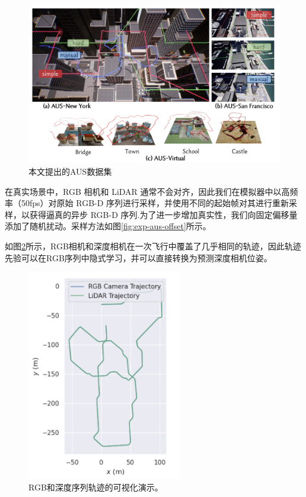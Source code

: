 \begin{figure}[ht]
    \centering
    \includegraphics[width=\textwidth]{undergraduate-thesis/images/experiments/Dataset-city.pdf}
    \caption{本文提出的AUS数据集}
    \label{fig:exp-aus-dataset}
\end{figure}

在真实场景中，RGB 相机和 LiDAR 通常不会对齐，因此我们在模拟器中以高频率（50fps）对原始 RGB-D 序列进行采样，并使用不同的起始帧对其进行重新采样，以获得逼真的异步 RGB-D 序列.为了进一步增加真实性，我们向固定偏移量添加了随机扰动。采样方法如图\ref{fig:exp-aus-offset}所示。

如图\ref{fig:exp-rgbd-alignment}所示，RGB相机和深度相机在一次飞行中覆盖了几乎相同的轨迹，因此轨迹先验可以在RGB序列中隐式学习，并可以直接转换为预测深度相机位姿。
\begin{figure}[ht]
    \centering
    \includegraphics[width=0.6\textwidth]{undergraduate-thesis/images/time-pose function/RGBD_alignment.pdf}
    \caption{RGB和深度序列轨迹的可视化演示。}
    \label{fig:exp-rgbd-alignment}
\end{figure}

